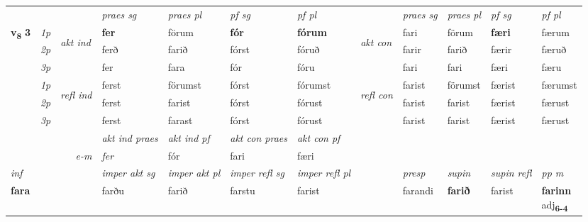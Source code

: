 \begin{longtable}[l]{X>{\footnotesize\itshape}llXXXXlXXXX}
 & &   & \textit{praes sg}  & \textit{praes pl}    & \textit{ pf sg} & \textit{pf pl} & & \textit{praes sg}  & \textit{praes pl}    & \textit{pf sg} & \textit{pf pl }  \\ \cmidrule{4-7} \cmidrule{9-12}
 \multirow{2}{*}{{{\textbf{v{\textsubscript{8}}} \Large{\textbf{3}}}}}  & 1p & \multirow{3}{*}{\begin{turn}{90}\textit{akt ind}\end{turn}} & \textbf{fer} & förum & \textbf{fór} & \textbf{fórum} & \multirow{3}{*}{\begin{turn}{90}\textit{akt con}\end{turn}} &fari & förum & \textbf{færi} & færum\\*
 & 2p &  &  ferð  & farið & fórst & fóruð & & farir & farið & færir & færuð \\*
 & 3p &  & fer & fara & fór & fóru & & fari & fari& færi & færu \\*
\cmidrule{4-7} \cmidrule{9-12}
 & 1p & \multirow{3}{*}{\begin{turn}{90}\textit{refl ind}\end{turn}}  & ferst & förumst & fórst & fórumst & \multirow{3}{*}{\begin{turn}{90}\textit{refl con}\end{turn}}  &farist & förumst & færist & færumst \\*
 & 2p &  & ferst & farist & fórst & fórust & &farist & farist & færist & færust \\*
 & 3p  & & ferst & farast & fórst & fórust & & farist & farist& færist & færust \\*
\cmidrule{4-7} \cmidrule{9-12}

   && &  \textit{akt ind praes} & \textit{akt ind pf} & \textit{akt con praes} & \textit{akt con pf} \\*
\multicolumn{3}{r}{\textit{e-m}} & fer & fór & fari & færi \\*

\cmidrule{4-7}
   {\textit{inf}} & &  & \textit{imper akt sg} & \textit{imper akt pl} & \textit{imper refl sg} & \textit{imper refl pl} && \textit{presp} & \textit{supin} & \textit{supin refl} & \textit{pp m} \\*
  {\textbf{fara}} & && farðu  & farið & farstu & farist && farandi &  \textbf{farið} & farist & \specialcell{\textbf{farinn} \\ adj\textbf{\textsubscript{6-4}}} \\*


\end{longtable}
